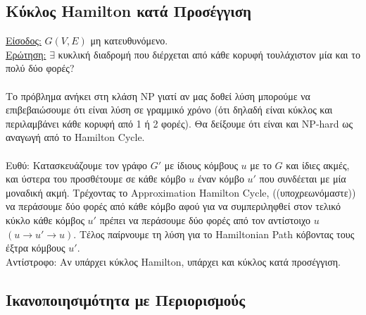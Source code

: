 \documentclass[12pt,a4paper]{article}
\begin{document}
  \subsection{Κύκλος {\latintext Hamilton} κατά Προσέγγιση}%

    \underline{Είσοδος:} \(G(V, E)\) μη κατευθυνόμενο.
    \\
    \underline{Ερώτηση:} \(\exists\) κυκλική διαδρομή που διέρχεται από κάθε 
    κορυφή τουλάχιστον μία και το πολύ δύο φορές?
    \\
    \\
    Το πρόβλημα ανήκει στη κλάση {\latintext NP} γιατί αν μας δοθεί λύση
    μπορούμε να
    επιβεβαιώσουμε ότι είναι λύση σε γραμμικό χρόνο (ότι δηλαδή είναι κύκλος
    και περιλαμβάνει κάθε κορυφή από 1 ή 2 φορές). Θα δείξουμε ότι είναι και
    {\latintext NP-hard} ως αναγωγή από το {\latintext Hamilton Cycle}.
    \\
    \\
    Eυθύ: Κατασκευάζουμε τον γράφο \(G'\) με ίδιους κόμβους \(u\) με το \(G\)
    και ίδιες ακμές, και ύστερα του προσθέτουμε σε κάθε κόμβο \(u\) έναν
    κόμβο \(u'\) που συνδέεται με μία μοναδική ακμή. Τρέχοντας το
    {\latintext Approximation Hamilton Cycle}, ((υποχρεωνόμαστε)) να περάσουμε
    δύο φορές από κάθε κόμβο αφού για να συμπεριληφθεί στον τελικό κύκλο κάθε
    κόμβος \(u'\) πρέπει να περάσουμε δύο φορές από τον αντίστοιχο \(u\) \( (u 
    \rightarrow u' \rightarrow u)\). Τέλος παίρνουμε τη λύση για το
    {\latintext Hamiltonian Path} κόβοντας τους έξτρα κόμβους \(u'\).
    \\
    Αντίστροφο: Αν υπάρχει κύκλος {\latintext Hamilton}, υπάρχει και κύκλος
    κατά προσέγγιση.

  \subsection{Ικανοποιησιμότητα με Περιορισμούς}%
\end{document}
